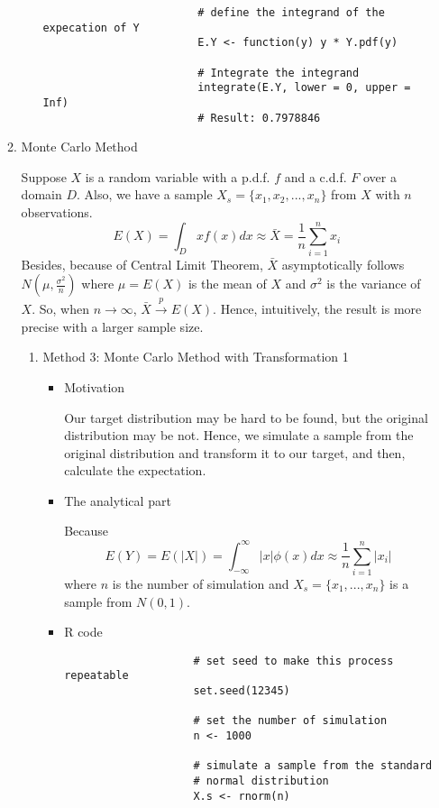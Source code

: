 \begin{enumerate}
\begin{enumerate}
\begin{itemize}
\begin{verbatim}
						# define the integrand of the expecation of Y
						E.Y <- function(y) y * Y.pdf(y)
						
						# Integrate the integrand
						integrate(E.Y, lower = 0, upper = Inf)
						# Result: 0.7978846
					\end{verbatim}
				\end{itemize}
			\item Monte Carlo Method
			\par Suppose $X$ is a random variable with a p.d.f. $f$ and a c.d.f. $F$ over a domain $D$. Also, we have a sample $X_s = \{x_1, x_2, ..., x_n\}$ from $X$ with $n$ observations.
			\begin{equation*}
			E(X) = \int_{D}xf(x)dx \approx \bar{X} = \frac{1}{n} \sum_{i = 1}^{n}x_i
			\end{equation*}
			Besides, because of Central Limit Theorem, $\bar{X}$ asymptotically follows $N(\mu, \frac{\sigma^2}{n})$ where $\mu = E(X)$ is the mean of $X$ and $\sigma^2$ is the variance of $X$. So, when $n \rightarrow \infty$, $\bar{X} \xrightarrow{p} E(X)$. Hence, intuitively, the result is more precise with a larger sample size.
			\begin{enumerate}
				\item Method 3: Monte Carlo Method with Transformation 1
				\begin{itemize}
					\item Motivation
					\par Our target distribution may be hard to be found, but the original distribution may be not. Hence, we simulate a sample from the original distribution and transform it to our target, and then, calculate the expectation.
					\item 
					\par The analytical part
					\par Because 
					\begin{equation*}
					E(Y) = E(|X|) = \int_{-\infty}^{\infty}|x| \phi(x)dx \approx \frac{1}{n}\sum_{i = 1}^{n} |x_i|
					\end{equation*}
					where $n$ is the number of simulation and $X_s = \{ x_1, ..., x_n\}$ is a sample from $N(0, 1)$.
					\item R code
					\begin{verbatim}
					# set seed to make this process repeatable
					set.seed(12345)
					
					# set the number of simulation
					n <- 1000
					
					# simulate a sample from the standard 
					# normal distribution
					X.s <- rnorm(n)
					

\end{verbatim}
\end{itemize}
\end{enumerate}
\end{enumerate}
\end{enumerate}
